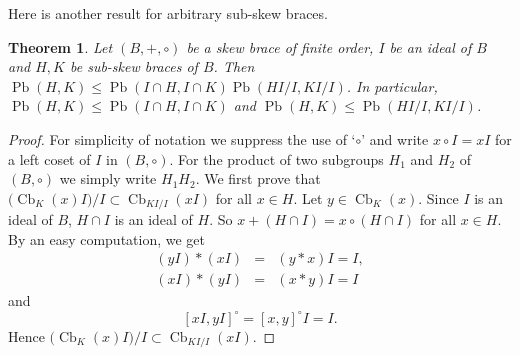 \documentclass[11pt, oneside]{amsart}
\numberwithin{equation}{section}
\theoremstyle{plain}
\newtheorem{thm}[equation]{Theorem}
\theoremstyle{definition}
\newcommand{\Cb}{\operatorname{Cb} }
\newcommand{\Pb}{\operatorname{Pb} }
\begin{document}
Here is another result for arbitrary sub-skew braces.
\begin{thm} %
    Let $(B,+, \circ)$ be a skew brace of finite order,  $I$ be an ideal of $B$ and $H,K$ be sub-skew braces of $B$. Then $\Pb(H,K)\leqslant \Pb(I\cap H, I\cap K)\Pb(HI/I,KI/I)$. In particular, $\Pb(H,K)\leqslant \Pb(I\cap H, I\cap K)$ and $\Pb(H,K) \leqslant \Pb(HI/I,KI/I)$.
\end{thm}
\begin{proof}
     For simplicity of notation we suppress the use of `$\circ$' and write $x \circ I = xI$ for a left coset of $I$ in $(B, \circ)$. For the product of two subgroups $H_1$ and $H_2$  of $(B, \circ)$ we simply write $H_1 H_2$.
 We first prove that $({\Cb_{K}(x)  I)/I} \subset \Cb_{KI/I}(x  I)$ for all $x\in H$. Let $y \in \Cb_{K}(x)$. Since $I$ is an ideal of $B$, $H\cap I$ is an ideal of $H$. So $x + (H\cap I) = x \circ (H \cap I)$ for all $x \in H$. By an easy computation, we get
 \begin{eqnarray*}
(y  I) * (x  I) &=& (y*x)  I  = I,\\
  (x  I) * (y  I) &=& (x*y)  I  = I  
  \end{eqnarray*}
  and 
  $$[x I, y  I]^{\circ} = [x, y]^{\circ}  I  = I.$$
Hence $({\Cb_{K}(x)  I)/I} \subset \Cb_{KI/I}(x  I)$.


\end{proof}
\end{document}
